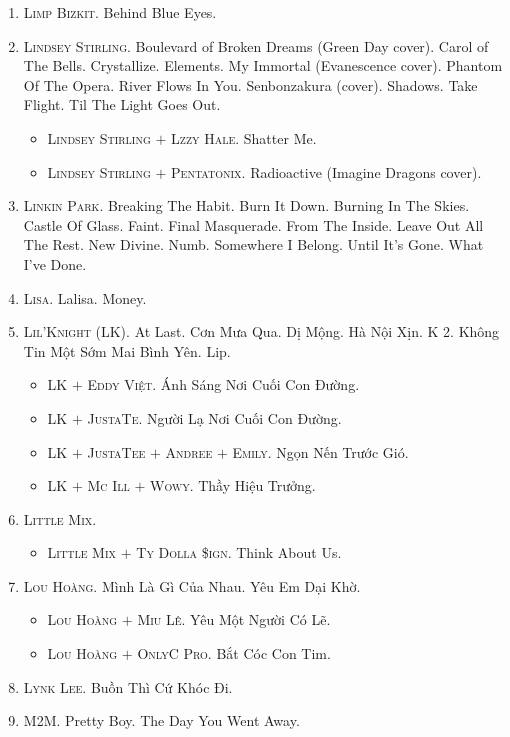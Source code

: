 \documentclass[oneside]{book}
\numberwithin{equation}{section}
\begin{document}
\begin{enumerate}
	\item \textsc{Limp Bizkit.} Behind Blue Eyes.
	\item \textsc{Lindsey Stirling.} Boulevard of Broken Dreams (Green Day cover). Carol of The Bells. Crystallize. Elements. My Immortal (Evanescence cover). Phantom Of The Opera. River Flows In You. Senbonzakura (cover). Shadows. Take Flight. Til The Light Goes Out.
	\begin{itemize}
		\item \textsc{Lindsey Stirling $+$ Lzzy Hale.} Shatter Me.
		\item \textsc{Lindsey Stirling $+$ Pentatonix.} Radioactive (Imagine Dragons cover).
	\end{itemize}
	\item \textsc{Linkin Park.} Breaking The Habit. Burn It Down. Burning In The Skies. Castle Of Glass. Faint. Final Masquerade. From The Inside. Leave Out All The Rest. New Divine. Numb. Somewhere I Belong. Until It's Gone. What I've Done.
	\item \textsc{Lisa.} Lalisa. Money.
	\item \textsc{Lil'Knight (LK).} At Last. Cơn Mưa Qua. Dị Mộng. Hà Nội Xịn. K 2. Không Tin Một Sớm Mai Bình Yên. Lip.
	\begin{itemize}
		\item \textsc{LK $+$ Eddy Việt.} Ánh Sáng Nơi Cuối Con Đường.
		\item \textsc{LK $+$ JustaTe.} Người Lạ Nơi Cuối Con Đường.
		\item \textsc{LK $+$ JustaTee $+$ Andree $+$ Emily.} Ngọn Nến Trước Gió.
		\item \textsc{LK $+$ Mc Ill $+$ Wowy.} Thầy Hiệu Trưởng.
	\end{itemize}
	\item \textsc{Little Mix.}
	\begin{itemize}
		\item \textsc{Little Mix $+$ Ty Dolla \$ign.} Think About Us.
	\end{itemize}
	\item \textsc{Lou Hoàng.} Mình Là Gì Của Nhau. Yêu Em Dại Khờ.
	\begin{itemize}
		\item \textsc{Lou Hoàng $+$ Miu Lê.} Yêu Một Người Có Lẽ.
		\item \textsc{Lou Hoàng $+$ OnlyC Pro.} Bắt Cóc Con Tim.
	\end{itemize}
	\item \textsc{Lynk Lee.} Buồn Thì Cứ Khóc Đi.
	\item \textsc{M2M.} Pretty Boy. The Day You Went Away.

\end{enumerate}
\end{document}
